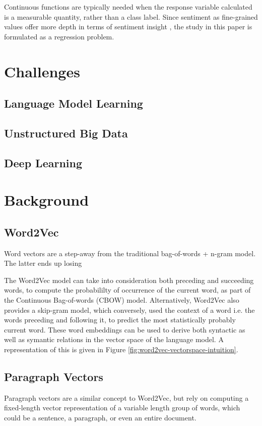\documentclass[conference]{IEEEtran}
\begin{document}
Continuous functions are typically needed when the response variable calculated is a measurable quantity, rather than a class label. Since sentiment as fine-grained values offer more depth in terms of sentiment insight \cite{drake2008sentiment}, the study in this paper is formulated as a regression problem.

\section{Challenges}

\subsection{Language Model Learning}

\subsection{Unstructured Big Data}

\subsection{Deep Learning}


\section{Background}

\subsection{Word2Vec} \label{Word2Vec}
Word vectors are a step-away from the traditional bag-of-words + n-gram model. The latter ends up losing

The Word2Vec model\cite{mikolov2013efficient} can take into consideration both preceding and succeeding words, to compute the probabililty of occurrence of the current word, as part of the Continuous Bag-of-words (CBOW) model. Alternatively, Word2Vec also provides a skip-gram model\cite{mikolov2013distributed}, which conversely, used the context of a word i.e. the words preceding and following it, to predict the most statistically probably current word. These word embeddings can be used to derive both syntactic as well as symantic relations in the vector space of the language model. A representation of this is given in Figure \ref{fig:word2vec-vectorspace-intuition}.

\subsection{Paragraph Vectors}
Paragraph vectors are a similar concept to Word2Vec, but rely on computing a fixed-length vector representation of a variable length group of words, which could be a sentence, a paragraph, or even an entire document.
\end{document}
